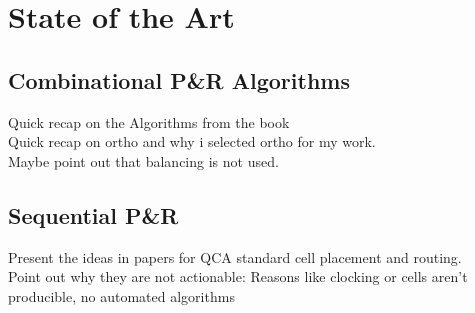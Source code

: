 \chapter{State of the Art}\label{chapter:SotA}

\section{Combinational P\&R Algorithms}

Quick recap on the Algorithms from the book \\
Quick recap on ortho and why i selected ortho for my work.\\
Maybe point out that balancing is not used.

\section{Sequential P\&R}
Present the ideas in papers for QCA standard cell placement and routing. \\
Point out why they are not actionable: Reasons like clocking or cells aren't producible, no automated algorithms